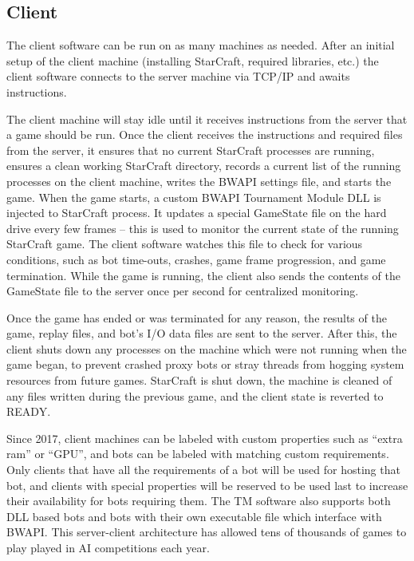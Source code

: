 \subsection{Client}

The client software can be run on as many machines as needed. After an initial setup of the client machine (installing StarCraft, required libraries, etc.) the client software connects to the server machine via TCP/IP and awaits instructions.

The client machine will stay idle until it receives instructions from the server that a game should be run. Once the client receives the instructions and required files from the server, it ensures that no current StarCraft processes are running, ensures a clean working StarCraft directory, records a current list of the running processes on the client machine, writes the BWAPI settings file, and starts the game. When the game starts, a custom BWAPI Tournament Module DLL is injected to StarCraft process. It updates a special GameState file on the hard drive every few frames -- this is used to monitor the current state of the running StarCraft game. The client software watches this file to check for various conditions, such as bot time-outs, crashes, game frame progression, and game termination. While the game is running, the client also sends the contents of the GameState file to the server once per second for centralized monitoring.

Once the game has ended or was terminated for any reason, the results of the game, replay files, and bot's I/O data files are sent to the server. After this, the client shuts down any processes on the machine which were not running when the game began, to prevent crashed proxy bots or stray threads from hogging system resources from future games. StarCraft is shut down, the machine is cleaned of any files written during the previous game, and the client state is reverted to READY.

Since 2017, client machines can be labeled with custom properties such as “extra ram” or “GPU”, and bots can be labeled with matching custom requirements. Only clients that have all the requirements of a bot will be used for hosting that bot, and clients with special properties will be reserved to be used last to increase their availability for bots requiring them. The TM software also supports both DLL based bots and bots with their own executable file which interface with BWAPI. This server-client architecture has allowed tens of thousands of games to play played in AI competitions each year.
